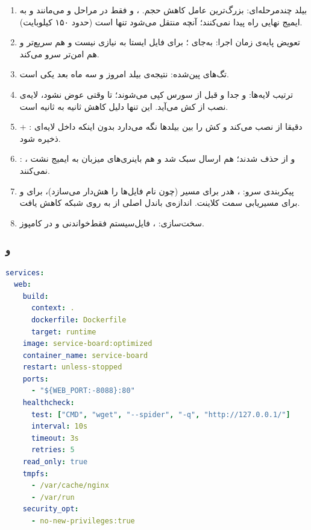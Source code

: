 \begin{enumerate}
	\item {بیلد چندمرحله‌ای}: بزرگ‌ترین عامل کاهش حجم. ،  و  فقط در مراحل  و  می‌مانند و به ایمیج نهایی راه پیدا نمی‌کنند؛ آنچه منتقل می‌شود تنها  است (حدود ۱۵۰ کیلوبایت).
	\item {تعویض پایه‌ی زمان اجرا}:  به‌جای ؛ برای فایل ایستا به  نیازی نیست و  هم سریع‌تر و هم امن‌تر سرو می‌کند.
	\item {تگ‌های پین‌شده}: نتیجه‌ی بیلد امروز و سه ماه بعد یکی است.
	\item {ترتیب لایه‌ها}:  و  جدا و {قبل} از سورس کپی می‌شوند؛ تا وقتی  عوض نشود، لایه‌ی نصب از کش می‌آید. این تنها دلیل کاهش  ثانیه به  ثانیه است.
	\item { + }:  دقیقا از  نصب می‌کند و  کش  را بین بیلدها نگه می‌دارد بدون اینکه داخل لایه‌ای ذخیره شود.
	\item {}: ،  و  از  حذف شدند؛ هم ارسال  سبک شد و هم باینری‌های میزبان به ایمیج نشت نمی‌کنند.
	\item {پیکربندی سرو}: ، هدر  برای مسیر  (چون  نام فایل‌ها را هش‌دار می‌سازد)،  برای  و  برای مسیریابی سمت کلاینت. اندازه‌ی باندل اصلی از  به  روی شبکه کاهش یافت.
	\item {سخت‌سازی}: ، فایل‌سیستم فقط‌خواندنی و  در کامپوز.
\end{enumerate}

\pagebreak

\subsubsection*{ و }

\begin{lstlisting}[language=Yaml]
services:
  web:
    build:
      context: .
      dockerfile: Dockerfile
      target: runtime
    image: service-board:optimized
    container_name: service-board
    restart: unless-stopped
    ports:
      - "${WEB_PORT:-8088}:80"
    healthcheck:
      test: ["CMD", "wget", "--spider", "-q", "http://127.0.0.1/"]
      interval: 10s
      timeout: 3s
      retries: 5
    read_only: true
    tmpfs:
      - /var/cache/nginx
      - /var/run
    security_opt:
      - no-new-privileges:true
\end{lstlisting}

